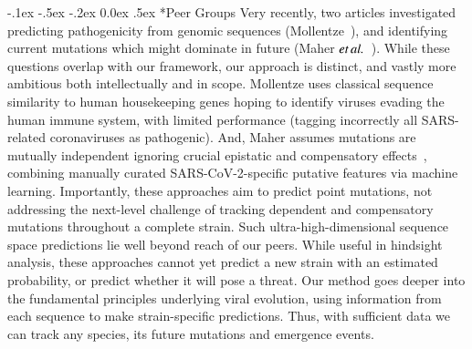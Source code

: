 \documentclass[onecolumn, compsoc,12pt]{IEEEtran}
\makeatletter
\renewcommand\paragraph{\@startsection {section}{1}{\z@}%
                                   {-.1ex \@plus -.5ex \@minus -.2ex}%
                                   {0.0ex \@plus.5ex}%
                                   {\fontsize{11}{10}\selectfont\bfseries\itshape\sffamily\color{black}}}
\def\hcov{SARS-CoV-2\xspace}
\makeatother
\begin{document}
\paragraph*{Peer Groups} %
Very recently, two articles investigated predicting pathogenicity  from genomic sequences (Mollentze~\cite{mollentze2021identifying}), and identifying current mutations which might dominate in future (Maher $\textit{et} \mspace{3mu} \textit{al.}$~\cite{maher2021predicting}). While these questions overlap with our framework,  our approach is distinct, and vastly more ambitious both intellectually and in scope. Mollentze  uses  classical  sequence similarity to  human housekeeping genes hoping to identify viruses  evading the human immune system, with limited   performance (tagging incorrectly all SARS-related coronaviruses as pathogenic). And, Maher assumes mutations are mutually independent ignoring crucial epistatic and compensatory effects~\cite{storz2018compensatory}, combining  manually curated \hcov-specific putative features via machine learning. Importantly, these approaches  %
 aim to predict point mutations, not addressing the next-level challenge of tracking dependent and compensatory mutations throughout a complete strain. Such ultra-high-dimensional sequence space predictions  lie well beyond reach of our peers. While useful in hindsight analysis, these approaches cannot yet predict a new strain with an estimated probability, or predict whether it will pose a threat.  Our method goes deeper into the fundamental principles underlying viral evolution, using information from each sequence to make strain-specific predictions. Thus, with sufficient data we can track any species,  its future mutations and emergence events. %


\end{document}

